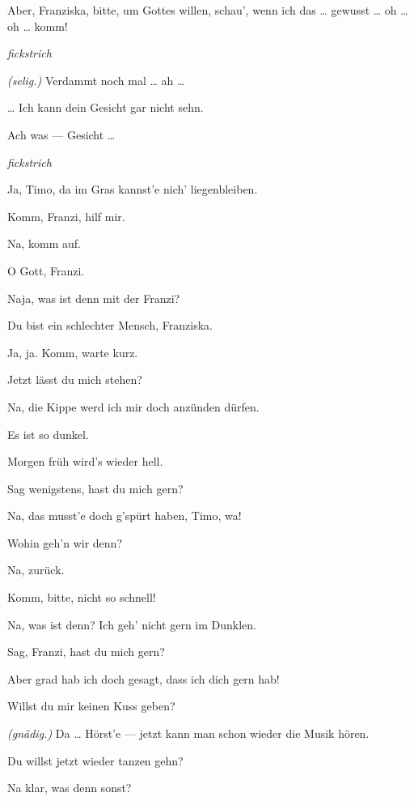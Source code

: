 \documentclass[
	final,
	a4paper,
	ngerman,
	mpinclude = true, %
	twoside = true,
	open = right,
	cleardoublepage = plain,
	DIV = 13,
	BCOR = 1cm,
	titlepage = firstiscover,
	]{scrbook}
\newcommand{\direction}[1]{\textit{(#1)}}
\newcommand{\hiat}{%
	\begin{center}
		\tiny
		\raisebox{0.5ex}{\rule{0.3\linewidth}{0.4pt}}
		\textit{fickstrich}
		\raisebox{0.5ex}{\rule{0.3\linewidth}{0.4pt}}
	\end{center}
}
\newcommand{\thecharacter}[1]{\textup{\textsc{#1}}\xspace}
\newcommand{\thesoldatin}{\thecharacter{Franziska}}
\newcommand{\thepraktikant}{\thecharacter{Timo}}
\newcommand{\character}[1]{\item[#1:]}
\newcommand{\soldatin}{\character{\thesoldatin}}
\newcommand{\praktikant}{\character{\thepraktikant}}
\begin{document}
\begin{play}
	\praktikant
	Aber, Franziska, bitte, um Gottes willen, schau', wenn ich das \ldots{} gewusst \ldots{} oh \ldots{} oh \ldots{} komm!

	\hiat

	\soldatin
	\direction{selig.} Verdammt noch mal \ldots{} ah \ldots{}

	\praktikant
	\ldots{} Ich kann dein Gesicht gar nicht sehn.

	\soldatin
	Ach was --- Gesicht \ldots{}

	\hiat

	\soldatin
	Ja, Timo, da im Gras kannst'e nich' liegenbleiben.

	\praktikant
	Komm, Franzi, hilf mir.

	\soldatin
	Na, komm auf.

	\praktikant
	O Gott, Franzi.

	\soldatin
	Naja, was ist denn mit der Franzi?

	\praktikant
	Du bist ein schlechter Mensch, Franziska.

	\soldatin
	Ja, ja. Komm, warte kurz.

	\praktikant
	Jetzt lässt du mich stehen?

	\soldatin
	Na, die Kippe werd ich mir doch anzünden dürfen.

	\praktikant
	Es ist so dunkel.

	\soldatin
	Morgen früh wird's wieder hell.

	\praktikant
	Sag wenigstens, hast du mich gern?

	\soldatin
	Na, das musst'e doch g'spürt haben, Timo, wa!

	\praktikant
	Wohin geh'n wir denn?

	\soldatin
	Na, zurück.

	\praktikant
	Komm, bitte, nicht so schnell!

	\soldatin
	Na, was ist denn? Ich geh' nicht gern im Dunklen.

	\praktikant
	Sag, Franzi, hast du mich gern?

	\soldatin
	Aber grad hab ich doch gesagt, dass ich dich gern hab!

	\praktikant
	Willst du mir keinen Kuss geben?

	\soldatin
	\direction{gnädig.} Da \ldots{} Hörst'e --- jetzt kann man schon wieder die Musik hören.

	\praktikant
	Du willst jetzt wieder tanzen gehn?

	\soldatin
	Na klar, was denn sonst?


\end{play}
\end{document}
